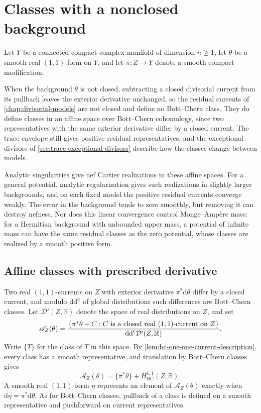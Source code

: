 \chapter{Classes with a nonclosed background}
\label{chap:nonclosed-bclasses}

Let $Y$ be a connected compact complex manifold of dimension $n\geq1$, let $\theta$ be a smooth real $(1,1)$-form on $Y$, and let $\pi\colon Z\to Y$ denote a smooth compact modification.

When the background $\theta$ is not closed, subtracting a closed divisorial current from its pullback leaves the exterior derivative unchanged, so the residual currents of \cref{chap:divisorial-models} are not closed and define no Bott--Chern class. They do define classes in an affine space over Bott--Chern cohomology, since two representatives with the same exterior derivative differ by a closed current. The trace envelope still gives positive residual representatives, and the exceptional divisors of \cref{sec:trace-exceptional-divisors} describe how the classes change between models.

Analytic singularities give nef Cartier realizations in these affine spaces. For a general potential, analytic regularization gives such realizations in slightly larger backgrounds, and on each fixed model the positive residual currents converge weakly. The error in the background tends to zero smoothly, but removing it can destroy nefness. Nor does this linear convergence control Monge--Amp\`ere mass: for a Hermitian background with unbounded upper mass, a potential of infinite mass can have the same residual classes as the zero potential, whose classes are realized by a smooth positive form.

\section{Affine classes with prescribed derivative}\label{sec:affine-model-space}

Two real $(1,1)$-currents on $Z$ with exterior derivative $\pi^*\mathrm{d}\theta$ differ by a closed current, and modulo $\mathrm{dd}^{\mathrm{c}}$ of global distributions such differences are Bott--Chern classes. Let $\mathcal D'(Z,\mathbb R)$ denote the space of real distributions on $Z$, and set
\[
 \mathscr A_Z(\theta)=
 \frac{\{\pi^*\theta+C:C\text{ is a closed real }(1,1)\text{-current on }Z\}}
      {\mathrm{dd}^{\mathrm{c}}\mathcal D'(Z,\mathbb R)}.
\]
Write $\{T\}$ for the class of $T$ in this space. By \cref{lem:bc-one-one-current-description}, every class has a smooth representative, and translation by Bott--Chern classes gives
\[
 \mathscr A_Z(\theta)=\{\pi^*\theta\}+H^{1,1}_{\mathrm{BC}}(Z,\mathbb R).
\]
A smooth real $(1,1)$-form $\eta$ represents an element of $\mathscr A_Z(\theta)$ exactly when $\mathrm{d}\eta=\pi^*\mathrm{d}\theta$. As for Bott--Chern classes, pullback of a class is defined on a smooth representative and pushforward on current representatives.

